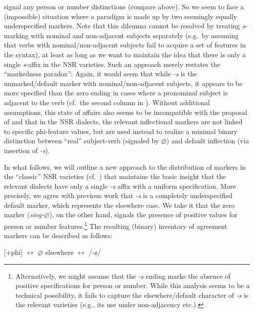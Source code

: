 \documentclass[output=paper]{langsci/langscibook}
\begin{document}
signal any person or number distinctions (compare  above). So
we seem to face a (impossible) situation where a paradigm is made up by two
seemingly equally underspecified markers. Note that this dilemma cannot be
resolved by treating \emph{s}-marking with nominal and non-adjacent subjects
separately (e.g.\ by assuming that verbs with nominal/non-adjacent subjects fail
to acquire a set of  features in the syntax), at least as long as we
want to maintain the idea that there is only a single \emph{s}-affix in the
\gls{NSR} varieties. Such an approach merely restates the ``markedness
paradox'': Again, it would seem that while \emph{-s} is the unmarked/default
marker with nominal/non-adjacent subjects, it appears to be more specified than
the zero ending in cases where a pronominal subject is adjacent to the verb
(cf.\ the second column in ). Without additional assumptions,
this state of affairs also seems to be incompatible with the proposal of
\textcite{deHaas:2011} and \textcite{deHaasandvanKemenade:2015} that in the
\gls{NSR} dialects, the relevant inflectional markers are not linked to
specific phi-feature values, but are used instead to realize a minimal binary
distinction between ``real'' subject-verb  (signaled by $\varnothing$) and default
inflection (via insertion of \emph{-s}).

In what follows, we will outline a new approach to the distribution of markers
in the ``classic'' \gls{NSR} varieties (cf.\ ) that maintains the basic
insight that the relevant dialects have only a single \emph{-s} affix with a
uniform specification. More precisely, we agree with previous work that
\emph{-s} is a completely underspecified default marker, which represents the
elsewhere case. We take it that the zero marker (\emph{sing-$\varnothing$}), on the
other hand, signals the presence of positive values for person or number
features.\footnote{Alternatively, we might assume that the \emph{-s} ending
    marks the absence of positive specifications for person or number. While this
    analysis seems to be a technical possibility, it fails to capture the
    elsewhere/default character of \emph{-s} is the relevant varieties
(e.g., its use under non-adjacency etc.).} The resulting (binary) inventory of
agreement markers can be described as follows:

\ea
\ea \mbox{[+phi]} $\leftrightarrow$ $\varnothing$
\ex elsewhere $\leftrightarrow$ /-z/
\z
\z
\end{document}
